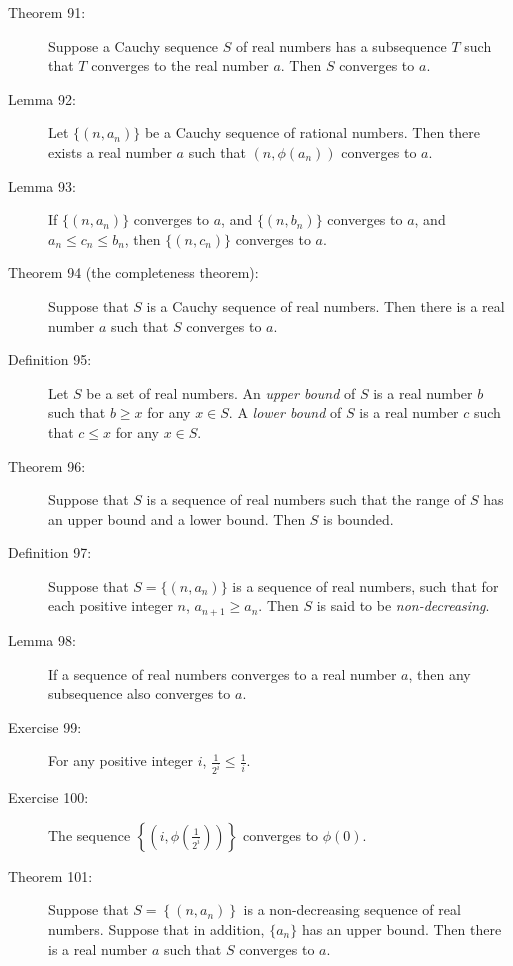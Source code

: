 \documentclass{article}
\begin{document}
\begin{description}
  \item[Theorem 91:] Suppose a Cauchy sequence $S$ of real numbers has a subsequence $T$ such that $T$ converges to the real number $a$. Then $S$ converges to $a$. 

  \item[Lemma 92:] Let $\{ (n, a_{n}) \}$ be a Cauchy sequence of rational numbers. Then there exists a real number $a$ such that $( n, \phi (a_{n}) )$ converges to $a$. 

  \item[Lemma 93:] If $\{ (n, a_{n}) \}$ converges to $a$, and $\{ (n, b_{n}) \}$ converges to $a$, and $a_{n} \leq c_{n} \leq b_{n}$, then $\{ (n, c_{n}) \}$ converges to $a$.

  \item[Theorem 94 (the completeness theorem):] Suppose that $S$ is a Cauchy sequence of real numbers. Then there is a real number $a$ such that $S$ converges to $a$.

  \item[Definition 95:] Let $S$ be a set of real numbers. An \emph{upper bound} of $S$ is a real number $b$ such that $b \geq x$ for any $x \in S$. A \emph{lower bound} of $S$ is a real number $c$ such that $c \leq x$ for any $x \in S$.

  \item[Theorem 96:] Suppose that $S$ is a sequence of real numbers such that the range of $S$ has an upper bound and a lower bound. Then $S$ is bounded. 

  \item[Definition 97:] Suppose that $S = \{ (n, a_{n}) \}$ is a sequence of real numbers, such that for each positive integer $n$, $a_{n+1} \geq a_{n}$. Then $S$ is said to be \emph{non-decreasing}.

  \item[Lemma 98:] If a sequence of real numbers converges to a real number $a$, then any subsequence also converges to $a$. 

  \item[Exercise 99:] For any positive integer $i$, $\frac{1}{2^{i}} \leq \frac{1}{i}$. 

  \item[Exercise 100:] The sequence $\left\{ \left( i, \phi \left( \frac{1}{2^{i}} \right) \right) \right\}$ converges to $\phi(0)$. 

  \item[Theorem 101:] Suppose that $S = \left\{ \left( n, a_{n} \right) \right\}$ is a non-decreasing sequence of real numbers. Suppose that in addition, $\{ a_{n} \}$ has an upper bound. Then there is a real number $a$ such that $S$ converges to $a$. 


\end{description}
\end{document}
